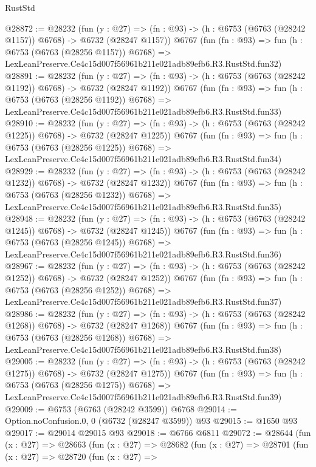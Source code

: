\begin{lexlean}{RustStd}
\begin{coremodule}
@28872 := @28232
    (fun (y : @27) =>
    (fn : @93) -> (h : @6753 (@6763 (@28242 @1157)) @6768) -> @6732 (@28247 @1157))
    @6767
    (fun (fn : @93) =>
    fun (h : @6753 (@6763 (@28256 @1157)) @6768) =>
    LexLeanPreserve.Ce4c15d007f56961b211e021adb89efb6.R3.RustStd.fun32)
@28891 := @28232
    (fun (y : @27) =>
    (fn : @93) -> (h : @6753 (@6763 (@28242 @1192)) @6768) -> @6732 (@28247 @1192))
    @6767
    (fun (fn : @93) =>
    fun (h : @6753 (@6763 (@28256 @1192)) @6768) =>
    LexLeanPreserve.Ce4c15d007f56961b211e021adb89efb6.R3.RustStd.fun33)
@28910 := @28232
    (fun (y : @27) =>
    (fn : @93) -> (h : @6753 (@6763 (@28242 @1225)) @6768) -> @6732 (@28247 @1225))
    @6767
    (fun (fn : @93) =>
    fun (h : @6753 (@6763 (@28256 @1225)) @6768) =>
    LexLeanPreserve.Ce4c15d007f56961b211e021adb89efb6.R3.RustStd.fun34)
@28929 := @28232
    (fun (y : @27) =>
    (fn : @93) -> (h : @6753 (@6763 (@28242 @1232)) @6768) -> @6732 (@28247 @1232))
    @6767
    (fun (fn : @93) =>
    fun (h : @6753 (@6763 (@28256 @1232)) @6768) =>
    LexLeanPreserve.Ce4c15d007f56961b211e021adb89efb6.R3.RustStd.fun35)
@28948 := @28232
    (fun (y : @27) =>
    (fn : @93) -> (h : @6753 (@6763 (@28242 @1245)) @6768) -> @6732 (@28247 @1245))
    @6767
    (fun (fn : @93) =>
    fun (h : @6753 (@6763 (@28256 @1245)) @6768) =>
    LexLeanPreserve.Ce4c15d007f56961b211e021adb89efb6.R3.RustStd.fun36)
@28967 := @28232
    (fun (y : @27) =>
    (fn : @93) -> (h : @6753 (@6763 (@28242 @1252)) @6768) -> @6732 (@28247 @1252))
    @6767
    (fun (fn : @93) =>
    fun (h : @6753 (@6763 (@28256 @1252)) @6768) =>
    LexLeanPreserve.Ce4c15d007f56961b211e021adb89efb6.R3.RustStd.fun37)
@28986 := @28232
    (fun (y : @27) =>
    (fn : @93) -> (h : @6753 (@6763 (@28242 @1268)) @6768) -> @6732 (@28247 @1268))
    @6767
    (fun (fn : @93) =>
    fun (h : @6753 (@6763 (@28256 @1268)) @6768) =>
    LexLeanPreserve.Ce4c15d007f56961b211e021adb89efb6.R3.RustStd.fun38)
@29005 := @28232
    (fun (y : @27) =>
    (fn : @93) -> (h : @6753 (@6763 (@28242 @1275)) @6768) -> @6732 (@28247 @1275))
    @6767
    (fun (fn : @93) =>
    fun (h : @6753 (@6763 (@28256 @1275)) @6768) =>
    LexLeanPreserve.Ce4c15d007f56961b211e021adb89efb6.R3.RustStd.fun39)
@29009 := @6753 (@6763 (@28242 @3599)) @6768
@29014 := Option.noConfusion.{0, 0} (@6732 (@28247 @3599)) @93
@29015 := @1650 @93
@29017 := @29014 @29015 @93
@29018 := @6766 @6811
@29072 := @28644
    (fun (x : @27) =>
    @28663
      (fun (x : @27) =>
      @28682
        (fun (x : @27) =>
        @28701
          (fun (x : @27) =>
          @28720
            (fun (x : @27) =>

\end{coremodule}
\end{lexlean}
